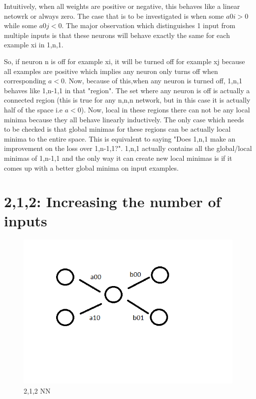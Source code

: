 \documentclass[conference]{IEEEtran}
\begin{document}
Intuitively, when all weights are positive or negative, this behaves like a linear netowrk or always zero. The case that is to be investigated is when some $a0i > 0$ while some $a0j < 0$. The major observation which distinguishes 1 input from multiple inputs is that these neurons will behave exactly the same for each example xi in 1,n,1.

So, if neuron n is off for example xi, it will be turned off for example xj because all examples are positive which implies any neuron only turns off when corresponding $a < 0$. Now, because of this,when any neuron is turned off, 1,n,1 behaves like 1,n-1,1 in that "region". The set where any neuron is off is actually a connected region (this is true for any n,n,n network, but in this case it is actually half of the space i.e $a < 0$). Now, local in these regions there can not be any local minima because they all behave linearly inductively. The only case which needs to be checked is that global minimas for these regions can be actually local minima to the entire space. This is equivalent to saying "Does 1,n,1 make an improvement on the loss over 1,n-1,1?". 1,n,1 actually contains all the global/local minimas of 1,n-1,1 and the only way it can create new local minimas is if it comes up with a better global minima on input examples.


\section{2,1,2: Increasing the number of inputs}

\begin{figure}
	\includegraphics[width=\linewidth]{images/nn/212.png}
	\caption{2,1,2 NN}
	\label{fig:212}
\end{figure}
\end{document}
